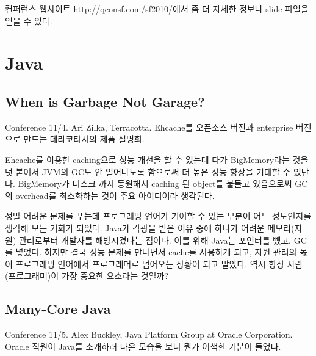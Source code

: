 \documentclass[11pt]{article}
\begin{document}
컨퍼런스 웹사이트 \url{http://qconsf.com/sf2010/}에서 좀 더 자세한 정보나 
slide 파일을 얻을 수 있다.


\section{Java}

\subsection{When is Garbage Not Garage?}

Conference 11/4. Ari Zilka, Terracotta.
Ehcache를 오픈소스 버전과 enterprise 버전으로 만드는 테라코타사의 제품 설명회.
 
Ehcache를 이용한 caching으로 성능 개선을 할 수 있는데 다가
BigMemory라는 것을 덧 붙여서 JVM의 GC도 안 일어나도록 함으로써 더 높은
성능 향상을 기대할 수 있단다.
BigMemory가 디스크 까지 동원해서 caching 된 object를 붙들고 있음으로써
GC의 overhead를 최소화하는 것이 주요 아이디어라 생각된다.
 
정말 어려운 문제를 푸는데 프로그래밍 언어가 기여할 수 있는 부분이 어느 
정도인지를 생각해 보는 기회가 되었다.
Java가 각광을 받은 이유 중에 하나가 어려운 메모리(자원) 관리로부터 개발자를 
해방시켰다는 점이다. 이를 위해 Java는 포인터를 뺐고, GC를 넣었다. 
하지만 결국 성능 문제를 만나면서 cache를 사용하게 되고, 자원 관리의 몫이 
프로그래밍 언어에서 프로그래머로 넘어오는 상황이 되고 말았다.
역시 항상 사람(프로그래머)이 가장 중요한 요소라는 것일까?

\subsection{Many-Core Java}
\label{many core java}

Conference 11/5. Alex Buckley, Java Platform Group at Oracle Corporation.
Oracle 직원이 Java를 소개하러 나온 모습을 보니 뭔가 어색한 기분이
들었다. 
\end{document}
